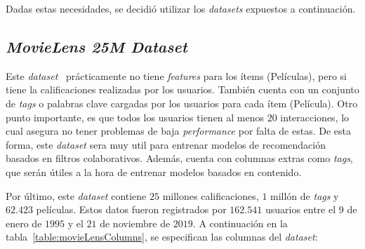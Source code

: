 \documentclass[11pt,a4paper,twoside]{thesis}
\begin{document}
Dadas estas necesidades, se decidió utilizar los \textit{datasets} expuestos a
continuación.

\subsection{\textit{MovieLens 25M Dataset}}

Este \textit{dataset}~\cite{movielens} prácticamente no tiene \textit{features}
para los ítems (Películas), pero si tiene la calificaciones realizadas por los
usuarios. También cuenta con un conjunto de \textit{tags} o palabras clave
cargadas por los usuarios para cada ítem (Película). Otro punto importante, es
que todos los usuarios tienen al menos $20$ interacciones, lo cual asegura no
tener problemas de baja \textit{performance} por falta de estas. De esta forma,
este \textit{dataset} sera muy util para entrenar modelos de recomendación
basados en filtros colaborativos. Además, cuenta con columnas extras como
\textit{tags}, que serán útiles a la hora de entrenar modelos basados en
contenido.

Por último, este \textit{dataset} contiene $25$ millones calificaciones, $1$
millón de \textit{tags} y $62.423$ películas. Estos datos fueron registrados
por $162.541$ usuarios entre el $9$ de enero de $1995$ y el $21$ de noviembre
de $2019$. A continuación en la tabla~\ref{table:movieLensColumns}, se
especifican las columnas del \textit{dataset}:
\end{document}
